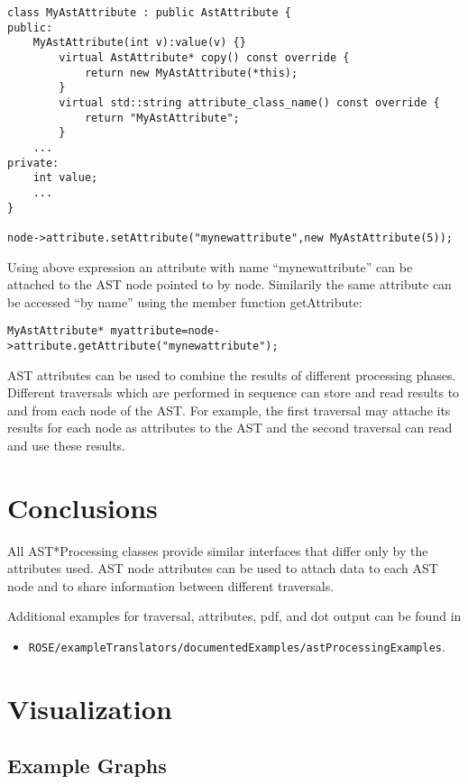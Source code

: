 \begin{verbatim}
class MyAstAttribute : public AstAttribute {
public:
	MyAstAttribute(int v):value(v) {}
        virtual AstAttribute* copy() const override {
            return new MyAstAttribute(*this);
        }
        virtual std::string attribute_class_name() const override {
            return "MyAstAttribute";
        }
	...
private:
	int value;
	...
}

node->attribute.setAttribute("mynewattribute",new MyAstAttribute(5));
\end{verbatim}

Using above expression an attribute with name ``mynewattribute'' can
be attached to the AST node pointed to by node. Similarily the same attribute can be accessed ``by name'' using the member function getAttribute:

\begin{verbatim}
MyAstAttribute* myattribute=node->attribute.getAttribute("mynewattribute");
\end{verbatim}

AST attributes can be used to combine the results of different
processing phases. Different traversals which are performed in
sequence can store and read results to and from each node of the
AST. For example, the first traversal may attache its results for each node as
attributes to the AST and the second traversal can read and use these results.

\section{Conclusions}

All AST*Processing classes provide similar interfaces that differ only by the attributes used. AST node attributes can be used to attach data to each AST node and to share information between different traversals. 

Additional examples for traversal, attributes, pdf, and dot output can be found in 
\begin{itemize}
\item \verb+ROSE/exampleTranslators/documentedExamples/astProcessingExamples+.
\end{itemize}

\section{Visualization}

\subsection{Example Graphs}

